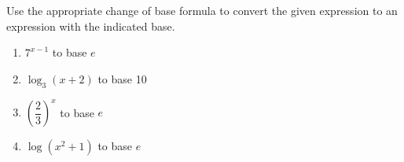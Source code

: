 \documentclass{ximera}
\author{Carl Stitz \and Jeff Zeager \and Bart Snapp \and Matthew Carr}
\begin{document}
\begin{exercise}





Use the appropriate change of base formula to convert the given
expression to an expression with the indicated base.

\begin{enumerate}
	\item $7^{x - 1}$ to base $e$

	\item $\log_{3}(x + 2)$ to base 10

	\item $\left(\dfrac{2}{3}\right)^{x}$ to base $e$

	\item $\log(x^{2} + 1)$ to base $e$ 
\end{enumerate}

\end{exercise}
\end{document}
